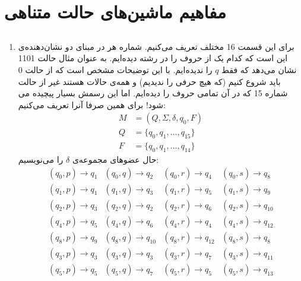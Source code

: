 \section{مفاهیم ماشین‌های حالت متناهی}
\subsection{}
\begin{enumerate}
    \item برای این قسمت 16  مختلف تعریف می‌کنیم.
    شماره هر 
    در مبنای دو نشان‌دهنده‌ی این است که کدام یک از حروف را در رشته دیده‌ایم.
    به عنوان مثال حالت
    1101
    نشان می‌دهد که فقط
    $q$
    را ندیده‌ایم. با این توضیحات مشخص است که از حالت 0 باید شروع کنیم
    (که هیچ حرفی را ندیدیم)
    و همه‌ی حالات
    هستند غیر از حالت شماره
    15
    که در آن تمامی حروف را دیده‌ایم. اما این
    رسمش بسیار پیچیده می شود! برای همین صرفا آنرا تعریف می‌کنیم:
    \begin{align*}
        M &= (Q, \Sigma, \delta, q_0, F)\\
        Q &= \{q_0,q_1,\dots,q_{15}\}\\
        F &= \{q_0,q_1,\dots,q_{14}\}
    \end{align*}
    حال عضو‌های مجموعه‌ی
    $\delta$
    را می‌نویسیم:
    \[
    \begin{array}{cccc}
        (q_0, p) \rightarrow q_1 & (q_0, q) \rightarrow q_2 & (q_0, r) \rightarrow q_4 & (q_0, s) \rightarrow q_8\\
        (q_1, p) \rightarrow q_1 & (q_1, q) \rightarrow q_3 & (q_1, r) \rightarrow q_5 & (q_1, s) \rightarrow q_9\\
        (q_2, p) \rightarrow q_3 & (q_2, q) \rightarrow q_2 & (q_2, r) \rightarrow q_6 & (q_2, s) \rightarrow q_{10}\\
        (q_4, p) \rightarrow q_5 & (q_4, q) \rightarrow q_6 & (q_4, r) \rightarrow q_4 & (q_4, s) \rightarrow q_{12}\\
        (q_8, p) \rightarrow q_9 & (q_8, q) \rightarrow q_{10} & (q_8, r) \rightarrow q_{12} & (q_8, s) \rightarrow q_{8}\\
        (q_3, p) \rightarrow q_{3} & (q_3, q) \rightarrow q_{3} & (q_3, r) \rightarrow q_{7} & (q_3, s) \rightarrow q_{11}\\
        (q_5, p) \rightarrow q_{5} & (q_5, q) \rightarrow q_{7} & (q_5, r) \rightarrow q_{5} & (q_5, s) \rightarrow q_{13}\\

\end{array}\]
\end{enumerate}
